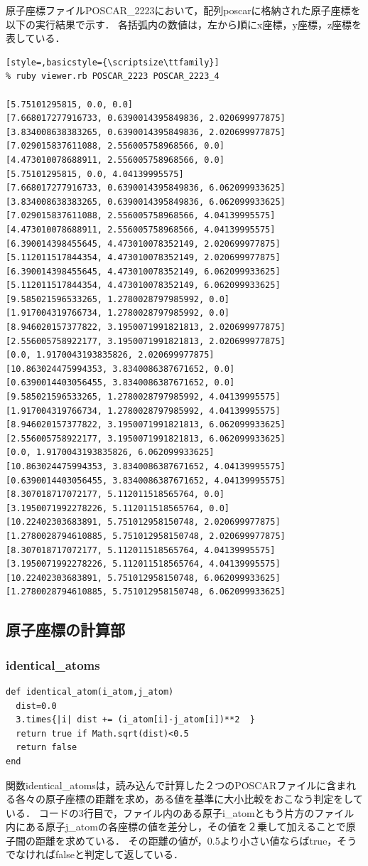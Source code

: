 原子座標ファイルPOSCAR\_2223において，配列poscarに格納された原子座標を以下の実行結果で示す．
各括弧内の数値は，左から順にx座標，y座標，z座標を表している．
\begin{lstlisting}[style=,basicstyle={\scriptsize\ttfamily}]
% ruby viewer.rb POSCAR_2223 POSCAR_2223_4

[5.75101295815, 0.0, 0.0]
[7.668017277916733, 0.6390014395849836, 2.020699977875]
[3.834008638383265, 0.6390014395849836, 2.020699977875]
[7.029015837611088, 2.556005758968566, 0.0]
[4.473010078688911, 2.556005758968566, 0.0]
[5.75101295815, 0.0, 4.04139995575]
[7.668017277916733, 0.6390014395849836, 6.062099933625]
[3.834008638383265, 0.6390014395849836, 6.062099933625]
[7.029015837611088, 2.556005758968566, 4.04139995575]
[4.473010078688911, 2.556005758968566, 4.04139995575]
[6.390014398455645, 4.473010078352149, 2.020699977875]
[5.112011517844354, 4.473010078352149, 2.020699977875]
[6.390014398455645, 4.473010078352149, 6.062099933625]
[5.112011517844354, 4.473010078352149, 6.062099933625]
[9.585021596533265, 1.2780028797985992, 0.0]
[1.917004319766734, 1.2780028797985992, 0.0]
[8.946020157377822, 3.1950071991821813, 2.020699977875]
[2.556005758922177, 3.1950071991821813, 2.020699977875]
[0.0, 1.9170043193835826, 2.020699977875]
[10.863024475994353, 3.8340086387671652, 0.0]
[0.6390014403056455, 3.8340086387671652, 0.0]
[9.585021596533265, 1.2780028797985992, 4.04139995575]
[1.917004319766734, 1.2780028797985992, 4.04139995575]
[8.946020157377822, 3.1950071991821813, 6.062099933625]
[2.556005758922177, 3.1950071991821813, 6.062099933625]
[0.0, 1.9170043193835826, 6.062099933625]
[10.863024475994353, 3.8340086387671652, 4.04139995575]
[0.6390014403056455, 3.8340086387671652, 4.04139995575]
[8.307018717072177, 5.112011518565764, 0.0]
[3.1950071992278226, 5.112011518565764, 0.0]
[10.22402303683891, 5.751012958150748, 2.020699977875]
[1.2780028794610885, 5.751012958150748, 2.020699977875]
[8.307018717072177, 5.112011518565764, 4.04139995575]
[3.1950071992278226, 5.112011518565764, 4.04139995575]
[10.22402303683891, 5.751012958150748, 6.062099933625]
[1.2780028794610885, 5.751012958150748, 6.062099933625]
\end{lstlisting}
\subsection{原子座標の計算部}
\subsubsection{identical\_atoms}\begin{lstlisting}[style=customRuby,basicstyle={\scriptsize\ttfamily}]
def identical_atom(i_atom,j_atom)
  dist=0.0
  3.times{|i| dist += (i_atom[i]-j_atom[i])**2  }
  return true if Math.sqrt(dist)<0.5
  return false
end
\end{lstlisting}
関数identical\_atomsは，読み込んで計算した２つのPOSCARファイルに含まれる各々の原子座標の距離を求め，ある値を基準に大小比較をおこなう判定をしている．
コードの3行目で，ファイル内のある原子i\_atomともう片方のファイル内にある原子j\_atomの各座標の値を差分し，その値を２乗して加えることで原子間の距離を求めている．
その距離の値が，0.5より小さい値ならばtrue，そうでなければfalseと判定して返している．

